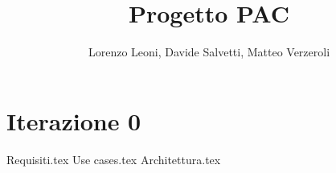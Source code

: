 \documentclass[
		a4paper,
		cleardoublepage=empty,
		headings=twolinechapter,
		numbers=autoenddot,
]{article}
\title{Progetto PAC}
\author{Lorenzo Leoni, Davide Salvetti, Matteo Verzeroli}
\begin{document}
	\maketitle
	
	
	\section{Iterazione 0}
	{Requisiti.tex}
	{Use cases.tex}
	{Architettura.tex}
	
	
\end{document}
